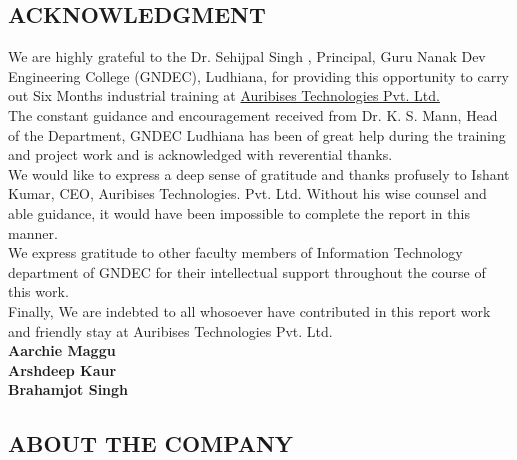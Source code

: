 \documentclass[12pt, oneside]{article}
\begin{document}
\newpage
\begin{center}
    \section*{ACKNOWLEDGMENT}
\end{center}
We are highly grateful to the Dr. Sehijpal Singh , Principal, Guru Nanak Dev Engineering College (GNDEC), Ludhiana, for providing this opportunity to carry out Six Months industrial training at \underline{Auribises Technologies Pvt. Ltd.}\\[0.25cm]
The constant guidance and encouragement received from Dr. K. S. Mann, Head of the Department, GNDEC Ludhiana has been of great help during the training and project work and is acknowledged with reverential thanks.\\[0.25cm]
We would like to express a deep sense of gratitude and thanks profusely to Ishant Kumar, CEO, Auribises Technologies. Pvt. Ltd. Without his wise counsel and able guidance, it would have been impossible to complete the report in this manner.\\[0.25cm]
We express gratitude to other faculty members of Information Technology department of GNDEC for their intellectual support throughout the course of this work.\\[0.25cm]
Finally, We are indebted to all whosoever have contributed in this report work and friendly stay at Auribises Technologies Pvt. Ltd.\\[0.5cm]

\textbf{Aarchie Maggu}\\[0.5cm]
\textbf{Arshdeep Kaur}\\[0.5cm]
\textbf{Brahamjot Singh}\\[0.5cm]

\newpage
\begin{center}
    \section*{ABOUT THE COMPANY}
\end{center}
\end{document}
